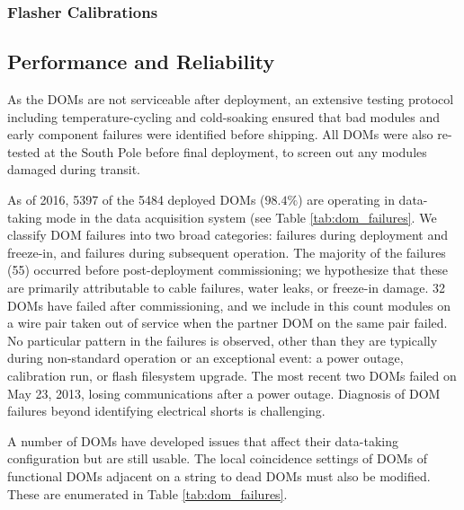 \subsubsection{Flasher Calibrations}

\subsection{Performance and Reliability}

As the DOMs are not serviceable after deployment, an extensive testing
protocol including temperature-cycling and cold-soaking ensured that bad
modules and early component failures were identified before shipping.
All DOMs were also re-tested at the South Pole before final deployment, to
screen out any modules damaged during transit.

As of 2016, 5397 of the 5484 deployed DOMs ($98.4\%$) are operating in
data-taking mode in the data acquisition system (see Table
\ref{tab:dom_failures}.  We classify DOM 
failures into two broad categories: failures during deployment and
freeze-in, and failures during subsequent operation.  The majority of the
failures (55) occurred before post-deployment commissioning; we hypothesize
that these are primarily attributable to cable failures, water leaks,
or freeze-in damage.  32 DOMs have failed after commissioning, and
we include in this count modules on a wire pair taken out of service when
the partner DOM on the same pair failed.  No particular pattern in the
failures is observed, other than they are typically during non-standard
operation or an exceptional event: a power outage, calibration run, or
flash filesystem upgrade.  The most recent two DOMs failed on May 23, 2013,
losing communications after a power outage.  Diagnosis of DOM failures
beyond identifying electrical shorts is challenging.

A number of DOMs have developed issues that affect their data-taking
configuration but are still usable.  The local coincidence settings of DOMs of
functional DOMs adjacent on a string to dead DOMs must also be
modified. These are enumerated in Table \ref{tab:dom_failures}.  

